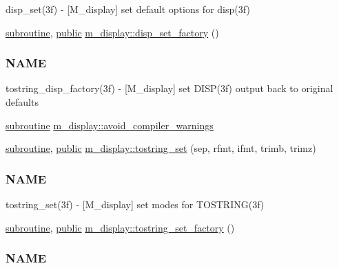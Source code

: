 \begin{DoxyCompactItemize}
\begin{DoxyCompactList}
disp\+\_\+set(3f) -\/ \mbox{[}M\+\_\+display\mbox{]} set default options for disp(3f) \end{DoxyCompactList}\item 
\hyperlink{M__stopwatch_83_8txt_acfbcff50169d691ff02d4a123ed70482}{subroutine}, \hyperlink{M__stopwatch_83_8txt_a2f74811300c361e53b430611a7d1769f}{public} \hyperlink{namespacem__display_a504ce34f82249882d1cc5a0ea2802bc6}{m\+\_\+display\+::disp\+\_\+set\+\_\+factory} ()
\begin{DoxyCompactList}\small\item\em \subsubsection*{N\+A\+ME}

tostring\+\_\+disp\+\_\+factory(3f) -\/ \mbox{[}M\+\_\+display\mbox{]} set D\+I\+S\+P(3f) output back to original defaults \end{DoxyCompactList}\item 
\hyperlink{M__stopwatch_83_8txt_acfbcff50169d691ff02d4a123ed70482}{subroutine} \hyperlink{namespacem__display_a6200cf732096469f40c38ec2baa6d811}{m\+\_\+display\+::avoid\+\_\+compiler\+\_\+warnings}
\item 
\hyperlink{M__stopwatch_83_8txt_acfbcff50169d691ff02d4a123ed70482}{subroutine}, \hyperlink{M__stopwatch_83_8txt_a2f74811300c361e53b430611a7d1769f}{public} \hyperlink{namespacem__display_ac6d80df8c70bb7d64df528d26851d6cb}{m\+\_\+display\+::tostring\+\_\+set} (sep, rfmt, ifmt, trimb, trimz)
\begin{DoxyCompactList}\small\item\em \subsubsection*{N\+A\+ME}

tostring\+\_\+set(3f) -\/ \mbox{[}M\+\_\+display\mbox{]} set modes for T\+O\+S\+T\+R\+I\+N\+G(3f) \end{DoxyCompactList}\item 
\hyperlink{M__stopwatch_83_8txt_acfbcff50169d691ff02d4a123ed70482}{subroutine}, \hyperlink{M__stopwatch_83_8txt_a2f74811300c361e53b430611a7d1769f}{public} \hyperlink{namespacem__display_abf51a5db397d27e0c6cb39e9f3fa7e24}{m\+\_\+display\+::tostring\+\_\+set\+\_\+factory} ()
\begin{DoxyCompactList}\small\item\em \subsubsection*{N\+A\+ME}


\end{DoxyCompactList}
\end{DoxyCompactItemize}
